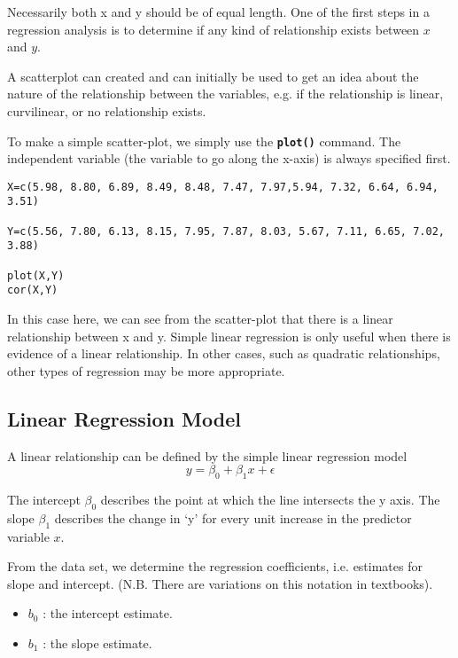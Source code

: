 \documentclass[ModuleBmain.tex]{subfiles}
\begin{document}
Necessarily both x and y should be of equal length. One of the first steps in a regression analysis is to determine if any kind of relationship exists between $x$ and $y$.

A scatterplot can created and can initially be used to get an idea about the nature of the relationship between the variables, e.g. if the relationship is linear, curvilinear, or no relationship exists.

To make a simple scatter-plot, we simply use the \texttt{\textbf{plot()}} command. The independent variable (the variable to go along the x-axis) is always specified first.



\begin{framed}
\begin{verbatim}
X=c(5.98, 8.80, 6.89, 8.49, 8.48, 7.47, 7.97,5.94, 7.32, 6.64, 6.94, 3.51)

Y=c(5.56, 7.80, 6.13, 8.15, 7.95, 7.87, 8.03, 5.67, 7.11, 6.65, 7.02, 3.88)

plot(X,Y)
cor(X,Y)
\end{verbatim}
\end{framed}
In this case here, we can see from the scatter-plot that there is a linear relationship between x and y.
Simple linear regression is only useful when there is evidence of a linear relationship. In other cases, such as quadratic relationships, other types of regression may be more appropriate.

\subsection{Linear Regression Model}

A linear relationship can be defined by the simple linear regression model
\[y = \beta_0 + \beta_1x + \epsilon\]

The intercept $\beta_0$ describes the point at which the line intersects the y axis.
The slope $\beta_1$ describes the change in ‘y’ for every unit increase in the predictor variable $x$.

From the data set, we determine the regression coefficients, i.e. estimates for slope and intercept. (N.B. There are variations on this notation in textbooks).

\begin{itemize}	\item $b_0$ : the intercept estimate.
\item	$b_1$ : the slope estimate.
\end{itemize}
\end{document}
